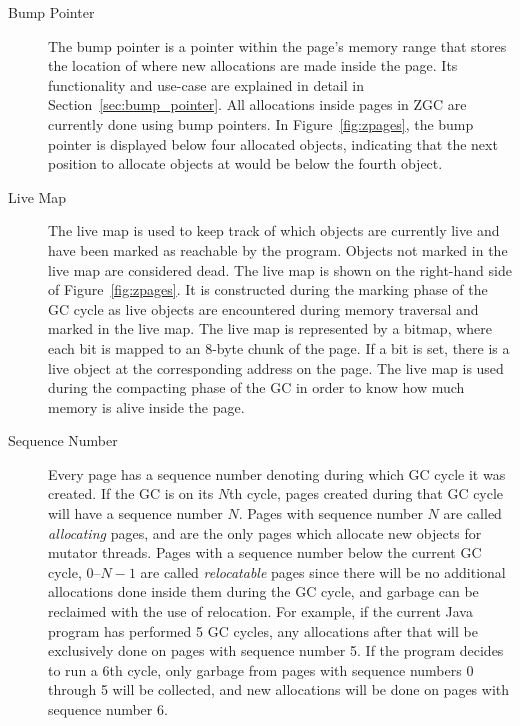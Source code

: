 \begin{description}
    \item[Bump Pointer]
        The bump pointer is a pointer within the page's memory range that stores the location of where new allocations are made inside the page. Its functionality and use-case are explained in detail in Section~\ref{sec:bump_pointer}. All allocations inside pages in ZGC are currently done using bump pointers. In Figure~\ref{fig:zpages}, the bump pointer is displayed below four allocated objects, indicating that the next position to allocate objects at would be below the fourth object.
        
    \item[Live Map]
        The live map is used to keep track of which objects are currently live and have been marked as reachable by the program. Objects not marked in the live map are considered dead. The live map is shown on the right-hand side of Figure~\ref{fig:zpages}. It is constructed during the marking phase of the GC cycle as live objects are encountered during memory traversal and marked in the live map. The live map is represented by a bitmap, where each bit is mapped to an 8-byte chunk of the page. If a bit is set, there is a live object at the corresponding address on the page. The live map is used during the compacting phase of the GC in order to know how much memory is alive inside the page.
        \newpage
    \item[Sequence Number]
        Every page has a sequence number denoting during which GC cycle it was created. If the GC is on its $N$th cycle, pages created during that GC cycle will have a sequence number $N$. Pages with sequence number $N$ are called \textit{allocating} pages, and are the only pages which allocate new objects for mutator threads. Pages with a sequence number below the current GC cycle, $0$--$N-1$ are called \textit{relocatable} pages since there will be no additional allocations done inside them during the GC cycle, and garbage can be reclaimed with the use of relocation. For example, if the current Java program has performed 5 GC cycles, any allocations after that will be exclusively done on pages with sequence number 5. If the program decides to run a 6th cycle, only garbage from pages with sequence numbers 0 through 5 will be collected, and new allocations will be done on pages with sequence number 6.
        

\end{description}
